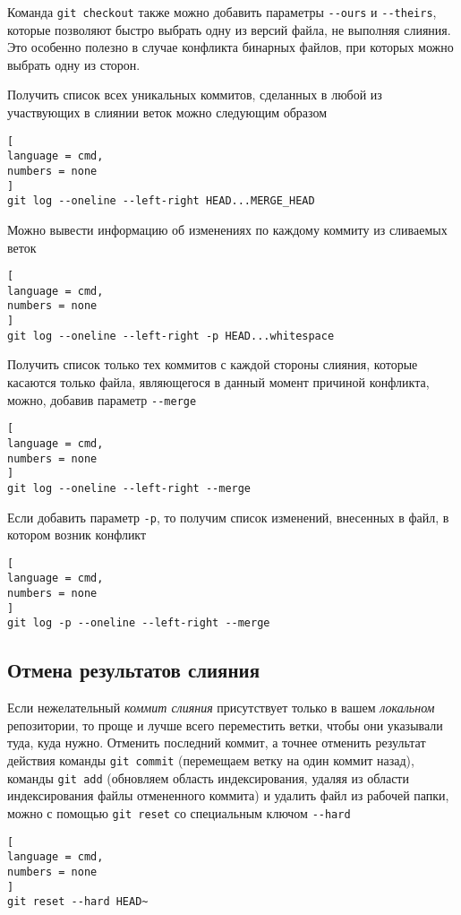 \documentclass[%
	11pt,
	a4paper,
	utf8,
		]{article}
\begin{document}
Команда \texttt{git checkout} также можно добавить параметры \verb|--ours| и \verb|--theirs|, которые позволяют быстро выбрать одну из версий файла, не выполняя слияния. Это особенно полезно в случае конфликта бинарных файлов, при которых можно выбрать одну из сторон.

Получить список всех уникальных коммитов, сделанных в любой из участвующих в слиянии веток можно следующим образом
\begin{lstlisting}[
language = cmd,
numbers = none
]
git log --oneline --left-right HEAD...MERGE_HEAD
\end{lstlisting}

Можно вывести информацию об изменениях по каждому коммиту из сливаемых веток
\begin{lstlisting}[
language = cmd,
numbers = none
]
git log --oneline --left-right -p HEAD...whitespace
\end{lstlisting}

Получить список только тех коммитов с каждой стороны слияния, которые касаются только файла, являющегося в данный момент причиной конфликта, можно, добавив параметр \verb|--merge|
\begin{lstlisting}[
language = cmd,
numbers = none
]
git log --oneline --left-right --merge
\end{lstlisting}

Если добавить параметр \texttt{-p}, то получим список изменений, внесенных в файл, в котором возник конфликт
\begin{lstlisting}[
language = cmd,
numbers = none
]
git log -p --oneline --left-right --merge
\end{lstlisting}

\subsection{Отмена результатов слияния}

Если нежелательный \emph{коммит слияния} присутствует только в вашем \emph{локальном} репозитории, то проще и лучше всего переместить ветки, чтобы они указывали туда, куда нужно. Отменить последний коммит, а точнее отменить результат действия команды \texttt{git commit} (перемещаем ветку на один коммит назад), команды \texttt{git add} (обновляем область индексирования, удаляя из области индексирования файлы отмененного коммита) и удалить файл из рабочей папки, можно с помощью \texttt{git reset} со специальным ключом \verb|--hard|
\begin{lstlisting}[
language = cmd,
numbers = none
]
git reset --hard HEAD~
\end{lstlisting}
\end{document}

